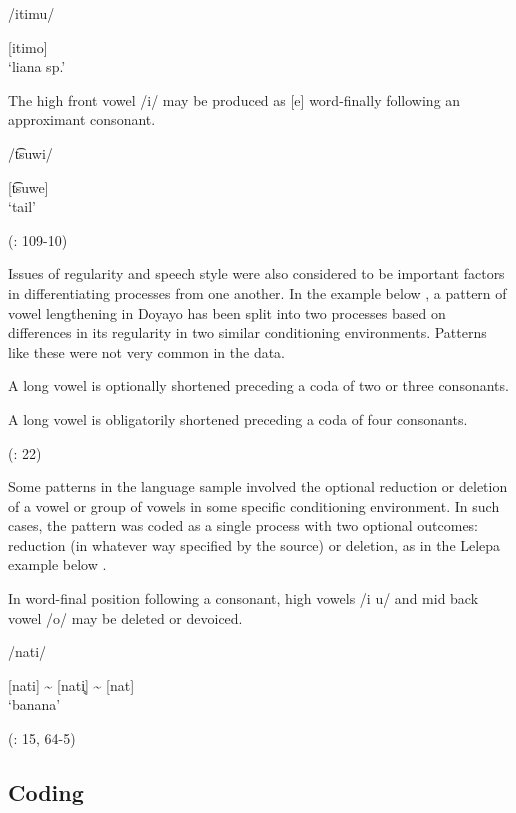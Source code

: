 /itimu/

[itimo]\\
\glt ‘liana sp.’

\ex   The high front vowel /i/ may be produced as [e] word-finally following an approximant consonant.

/t͡suwi/

[t͡suwe]\\
\glt ‘tail’

(\citealt{VallejosYopán2010}: 109-10)
\z
\z

  Issues of regularity and speech style were also considered to be important factors in differentiating processes from one another. In the example below , a pattern of vowel lengthening in Doyayo has been split into two processes based on differences in its regularity in two similar conditioning environments. Patterns like these were not very common in the data.

\ea\label{ex:6.12}

\ea A long vowel is optionally shortened preceding a coda of two or three consonants.

\ex  A long vowel is obligatorily shortened preceding a coda of four consonants.

(\citealt{WieringWiering1994}: 22)
\z
\z

  Some patterns in the language sample involved the optional reduction or deletion of a vowel or group of vowels in some specific conditioning environment. In such cases, the pattern was coded as a single process with two optional outcomes: reduction (in whatever way specified by the source) or deletion, as in the Lelepa example below .

\ea\label{ex:6.13}

In word-final position following a consonant, high vowels /i u/ and mid back vowel /o/ may be deleted or devoiced.

/nati/

[nati] {\textasciitilde} [nati̥] {\textasciitilde} [nat]\\
\glt ‘banana’

(\citealt{Lacrampe2014}: 15, 64-5)
\z

\subsection{Coding}\label{sec:6.2.3}

